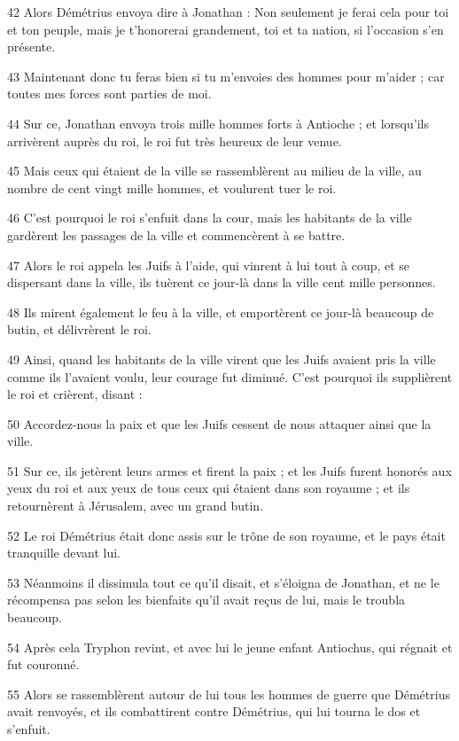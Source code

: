 \par 42 Alors Démétrius envoya dire à Jonathan : Non seulement je ferai cela pour toi et ton peuple, mais je t'honorerai grandement, toi et ta nation, si l'occasion s'en présente.
\par 43 Maintenant donc tu feras bien si tu m'envoies des hommes pour m'aider ; car toutes mes forces sont parties de moi.
\par 44 Sur ce, Jonathan envoya trois mille hommes forts à Antioche ; et lorsqu'ils arrivèrent auprès du roi, le roi fut très heureux de leur venue.
\par 45 Mais ceux qui étaient de la ville se rassemblèrent au milieu de la ville, au nombre de cent vingt mille hommes, et voulurent tuer le roi.
\par 46 C'est pourquoi le roi s'enfuit dans la cour, mais les habitants de la ville gardèrent les passages de la ville et commencèrent à se battre.
\par 47 Alors le roi appela les Juifs à l'aide, qui vinrent à lui tout à coup, et se dispersant dans la ville, ils tuèrent ce jour-là dans la ville cent mille personnes.
\par 48 Ils mirent également le feu à la ville, et emportèrent ce jour-là beaucoup de butin, et délivrèrent le roi.
\par 49 Ainsi, quand les habitants de la ville virent que les Juifs avaient pris la ville comme ils l'avaient voulu, leur courage fut diminué. C'est pourquoi ils supplièrent le roi et crièrent, disant :
\par 50 Accordez-nous la paix et que les Juifs cessent de nous attaquer ainsi que la ville.
\par 51 Sur ce, ils jetèrent leurs armes et firent la paix ; et les Juifs furent honorés aux yeux du roi et aux yeux de tous ceux qui étaient dans son royaume ; et ils retournèrent à Jérusalem, avec un grand butin.
\par 52 Le roi Démétrius était donc assis sur le trône de son royaume, et le pays était tranquille devant lui.
\par 53 Néanmoins il dissimula tout ce qu'il disait, et s'éloigna de Jonathan, et ne le récompensa pas selon les bienfaits qu'il avait reçus de lui, mais le troubla beaucoup.
\par 54 Après cela Tryphon revint, et avec lui le jeune enfant Antiochus, qui régnait et fut couronné.
\par 55 Alors se rassemblèrent autour de lui tous les hommes de guerre que Démétrius avait renvoyés, et ils combattirent contre Démétrius, qui lui tourna le dos et s'enfuit.

